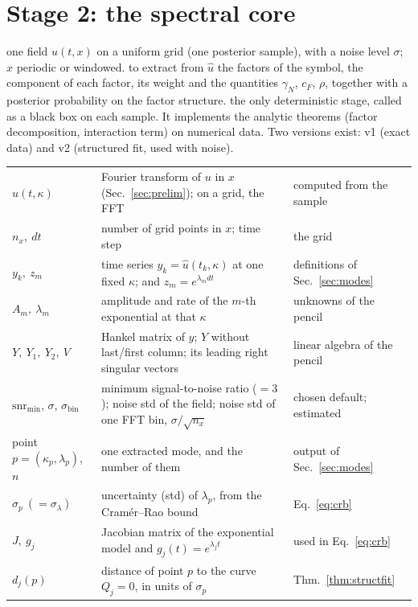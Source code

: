 \section{Stage 2: the spectral core}\label{sec:core}
\sectionbrief
{one field $\hat u(t,x)$ on a uniform grid (one posterior sample), with a noise level $\sigma$; $x$ periodic or windowed.}
{to extract from $\hat u$ the factors of the symbol, the component of each factor, its weight and the quantities $\gamma_N$, $c_F$, $\rho$, together with a posterior probability on the factor structure.}
{the only deterministic stage, called as a black box on each sample. It implements the analytic theorems (factor decomposition, interaction term) on numerical data. Two versions exist: v1 (exact data) and v2 (structured fit, used with noise).}

\begin{symbols}
\begin{tabular}{@{}L{2.5cm}L{6.0cm}L{4.4cm}@{}}
$\hat u(t,\kappa)$ & Fourier transform of $u$ in $x$ (Sec.~\ref{sec:prelim}); on a grid, the FFT & computed from the sample\\
$n_x,\ dt$ & number of grid points in $x$; time step & the grid\\
$y_k,\ z_m$ & time series $y_k=\hat u(t_k,\kappa)$ at one fixed $\kappa$; and $z_m=e^{\lambda_mdt}$ & definitions of Sec.~\ref{sec:modes}\\
$A_m,\ \lambda_m$ & amplitude and rate of the $m$-th exponential at that $\kappa$ & unknowns of the pencil\\
$Y,\ Y_1,\ Y_2,\ V$ & Hankel matrix of $y$; $Y$ without last/first column; its leading right singular vectors & linear algebra of the pencil\\
$\mathrm{snr}_{\min}$, $\sigma$, $\sigma_{\mathrm{bin}}$ & minimum signal-to-noise ratio ($=3$); noise std of the field; noise std of one FFT bin, $\sigma/\sqrt{n_x}$ & chosen default; estimated\\
point $p=(\kappa_p,\lambda_p)$, $n$ & one extracted mode, and the number of them & output of Sec.~\ref{sec:modes}\\
$\sigma_p\ (=\sigma_\lambda)$ & uncertainty (std) of $\lambda_p$, from the Cram\'er--Rao bound & Eq.~\eqref{eq:crb}\\
$J,\ g_j$ & Jacobian matrix of the exponential model and $g_j(t)=e^{\lambda_jt}$ & used in Eq.~\eqref{eq:crb}\\
$d_j(p)$ & distance of point $p$ to the curve $Q_j=0$, in units of $\sigma_p$ & Thm.~\ref{thm:structfit}\\

\end{tabular}
\end{symbols}
